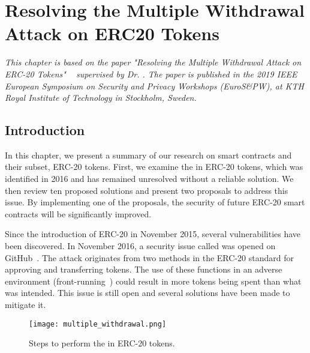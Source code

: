 
\chapter{Resolving the Multiple Withdrawal Attack on ERC20 Tokens}\label{ch:multiple}

\textit{This chapter is based on the paper "Resolving the Multiple Withdrawal Attack on ERC-20 Tokens" ~\cite{MultipleWithdrawal} supervised by Dr. \supv. The paper is published in the 2019 IEEE European Symposium on Security and Privacy Workshops (EuroS\&PW), at KTH Royal Institute of Technology in Stockholm, Sweden.}

\section{Introduction}
In this chapter, we present a summary of our research on smart contracts and their subset, ERC-20 tokens. First, we examine the \mwa in ERC-20 tokens, which was identified in 2016 and has remained unresolved without a reliable solution. We then review ten proposed solutions and present two proposals to address this issue. By implementing one of the proposals, the security of future ERC-20 smart contracts will be significantly improved.

Since the introduction of ERC-20 in November 2015, several vulnerabilities have been discovered. In November 2016, a security issue called \mwa was opened on GitHub~\cite{AttackVector,Resolution}. The attack originates from two methods in the ERC-20 standard for approving and transferring tokens. The use of these functions in an adverse environment (\eg front-running~\cite{eskandari2019sok}) could result in more tokens being spent than what was intended. This issue is still open and several solutions have been made to mitigate it.

\begin{figure}[t]
	\centering
	\texttt{[image: multiple\_withdrawal.png]}
	\caption[Steps for the \mwa in ERC-20 tokens]{Steps to perform the \mwa in ERC-20 tokens.}
	\label{fig:mwa}
\end{figure}

